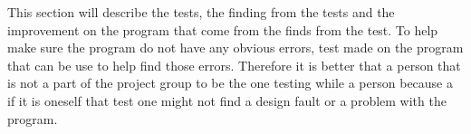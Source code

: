 This section will describe the tests, the finding from the tests and the improvement on the program that come from the finds from the test. To help make sure the program do not have any obvious errors, test made on the program that can be use to help find those errors. Therefore it is better that a person that is not a part of the project group to be the one testing while a person because a if it is oneself that test one might not find a design fault or a problem with the program.
